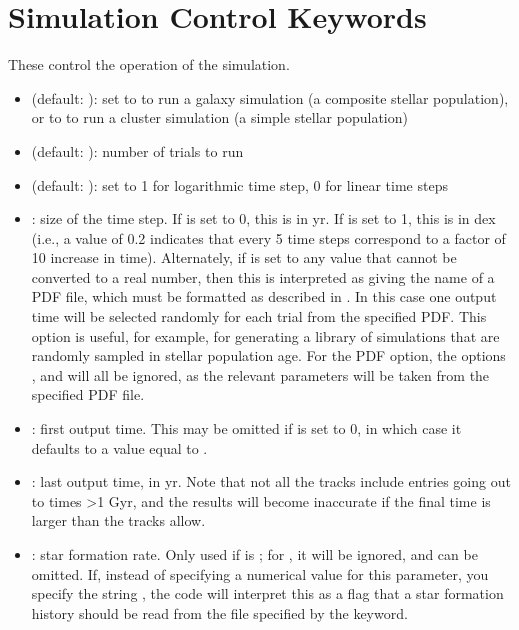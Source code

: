 \documentclass[letterpaper,10pt,english]{sphinxmanual}
\begin{document}
\section{Simulation Control Keywords}
\label{parameters:simulation-control-keywords}
These control the operation of the simulation.
\begin{itemize}
\item {} 
 (default: ): set to  to run a galaxy simulation (a composite stellar population), or to  to run a cluster simulation (a simple stellar population)

\item {} 
 (default: ): number of trials to run

\item {} 
 (default: ): set to 1 for logarithmic time step, 0 for linear time steps

\item {} 
: size of the time step. If  is set to 0, this is in yr. If  is set to 1, this is in dex (i.e., a value of 0.2 indicates that every 5 time steps correspond to a factor of 10 increase in time). Alternately, if  is set to any value that cannot be converted to a real number, then this is interpreted as giving the name of a PDF file, which must be formatted as described in {\hyperref[pdfs:sec-pdfs]{\emph{}}}. In this case one output time will be selected randomly for each trial from the specified PDF. This option is useful, for example, for generating a library of simulations that are randomly sampled in stellar population age. For the PDF option, the options ,  and  will all be ignored, as the relevant parameters will be taken from the specified PDF file.

\item {} 
: first output time. This may be omitted if  is set to 0, in which case it defaults to a value equal to .

\item {} 
: last output time, in yr. Note that not all the tracks include entries going out to times \textgreater{}1 Gyr, and the results will become inaccurate if the final time is larger than the tracks allow.

\item {} 
: star formation rate. Only used if  is ; for , it will be ignored, and can be omitted. If, instead of specifying a numerical value for this parameter, you specify the string , the code will interpret this as a flag that a star formation history should be read from the file specified by the  keyword.


\end{itemize}
\end{document}
